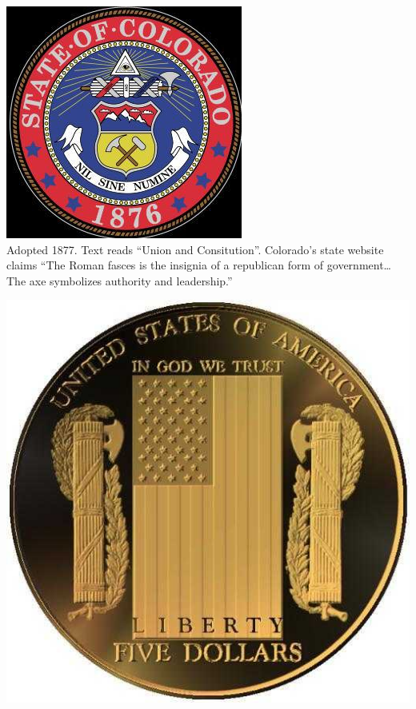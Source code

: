 \begin{frame}
    \centering
    \includegraphics[height=.8\textheight]{img/fasces/fasces13.jpg} \\
    Adopted 1877. Text reads ``Union and Consitution''. Colorado's state website claims ``The Roman fasces is the insignia of a republican form of government\ldots The axe symbolizes authority and leadership.'' \\
\end{frame}
\begin{frame}
    \centering
    \includegraphics[height=.8\textheight]{img/fasces/fasces5coin.jpg} \\
\end{frame}

